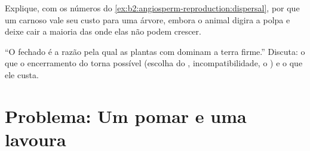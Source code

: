 \begin{exercise}[$\star\star\star$]\label{exo:b2:angiosperm-reproduction:11}
Explique, com os números do \cref{ex:b2:angiosperm-reproduction:dispersal},
por que um  carnoso vale seu custo para uma árvore, embora o
animal digira a polpa e deixe cair a maioria das  onde elas não
podem crescer.
\end{exercise}

\begin{exercise}[$\star\star\star$]\label{exo:b2:angiosperm-reproduction:12}
``O  fechado é a razão pela qual as plantas com  dominam
a terra firme.'' Discuta: o que o encerramento do  torna possível
(escolha do , incompatibilidade, o ) e o que ele custa.
\end{exercise}

\section{Problema: Um pomar e uma lavoura}

